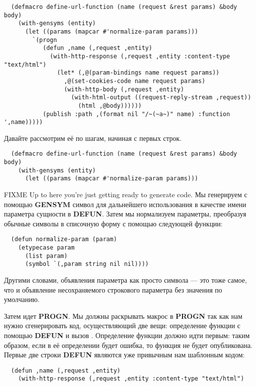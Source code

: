 \begin{lstlisting}
  (defmacro define-url-function (name (request &rest params) &body body)
    (with-gensyms (entity)
      (let ((params (mapcar #'normalize-param params)))
        `(progn
           (defun ,name (,request ,entity)
             (with-http-response (,request ,entity :content-type "text/html")
               (let* (,@(param-bindings name request params))
                 ,@(set-cookies-code name request params)
                 (with-http-body (,request ,entity)
                   (with-html-output ((request-reply-stream ,request))
                     (html ,@body))))))
           (publish :path ,(format nil "/~(~a~)" name) :function ',name)))))
\end{lstlisting}

Давайте рассмотрим её по шагам, начиная с первых строк.

\begin{lstlisting}
  (defmacro define-url-function (name (request &rest params) &body body)
    (with-gensyms (entity)
      (let ((params (mapcar #'normalize-param params)))
\end{lstlisting}

FIXME Up to here you're just getting ready to generate code. Мы генерируем с помощью
\textbf{GENSYM} символ для дальнейшего использования в качестве имени параметра сущности в
\textbf{DEFUN}. Затем мы нормализуем параметры, преобразуя обычные символы в списочную
форму с помощью следующей функции:

\begin{lstlisting}
  (defun normalize-param (param)
    (etypecase param
      (list param)
      (symbol `(,param string nil nil))))
\end{lstlisting}

Другими словами, объявления параметра как просто символа --- это тоже самое, что и
объявление несохраняемого строкового параметра без значения по умолчанию.

Затем идет \textbf{PROGN}. Мы должны раскрывать макрос в \textbf{PROGN} так как нам нужно
сгенерировать код, осуществляющий две вещи: определение функции с помощью \textbf{DEFUN} и
вызов . Определение функции должно идти первым: таким образом, если в её
определении будет ошибка, то функция не будет опубликована. Первые две строки
\textbf{DEFUN} являются уже привычным нам шаблонным кодом:

\begin{lstlisting}
  (defun ,name (,request ,entity)
    (with-http-response (,request ,entity :content-type "text/html")  
\end{lstlisting}


